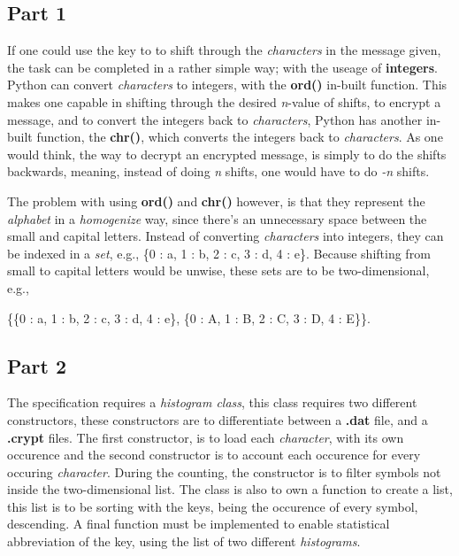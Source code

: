 \documentclass[a4paper,10pt]{article}
\begin{document}
\subsection{Part 1}

If one could use the key to to shift through the \textit{characters} in the message given, the task can be completed in a rather simple way; with the useage of \textbf{integers}. Python can convert \textit{characters} to integers, with the \textbf{ord()} in-built function. This makes one capable in shifting through the desired \textit{n}-value of shifts, to encrypt a message, and to convert the integers back to \textit{characters}, Python has another in-built function, the \textbf{chr()}, which converts the integers back to \textit{characters}.
As one would think, the way to decrypt an encrypted message, is simply to do the shifts backwards, meaning, instead of doing \textit{n} shifts, one would have to do \textit{-n} shifts.

The problem with using \textbf{ord()} and \textbf{chr()} however, is that they represent the \textit{alphabet} in a \textit{homogenize} way, since there's an unnecessary space between the small and capital letters.
Instead of converting \textit{characters} into integers, they can be indexed in a \textit{set}, e.g., \{0 : a, 1 : b, 2 : c, 3 : d, 4 : e\}.
Because shifting from small to capital letters would be unwise, these sets are to be two-dimensional, e.g., 

\{\{0 : a, 1 : b, 2 : c, 3 : d, 4 : e\}, \{0 : A, 1 : B, 2 : C, 3 : D, 4 : E\}\}.

\subsection{Part 2}

The specification requires a \textit{histogram class}, this class requires two different constructors, these constructors are to differentiate between a \textbf{.dat} file, and a \textbf{.crypt} files. The first constructor, is to load each \textit{character}, with its own occurence and the second constructor is to account each occurence for every occuring \textit{character}. During the counting, the constructor is to filter symbols not inside the two-dimensional list.
The class is also to own a function to create a list, this list is to be sorting with the keys, being the occurence of every symbol, descending. A final function must be implemented to enable statistical abbreviation of the key, using the list of two different \textit{histograms}.
\end{document}
